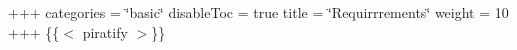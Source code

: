 +++ categories = \char`\"{}basic\char`\"{} disable\+Toc = true title = \char`\"{}\+Requirrrements\char`\"{} weight = 10 +++ \{\{$<$ piratify $>$\}\} 